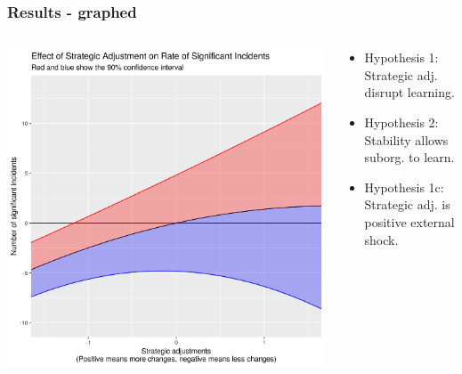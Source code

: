 \begin{frame}
	\frametitle{Results - graphed}
	\begin{columns}
		\begin{column}{0.6\textwidth}
			\includegraphics[scale=0.4]{resources/effect_size.png}
		\end{column}
		\begin{column}{0.4\textwidth}
			\begin{itemize}
				\item Hypothesis 1: Strategic adj. disrupt learning. \textcolor{red}{}
				\item Hypothesis 2: Stability allows suborg. to learn. \textcolor{olive}{}
				\item Hypothesis 1c: Strategic adj. is positive external shock. \textcolor{red}{}
			\end{itemize}
		\end{column}
	\end{columns}
\end{frame}